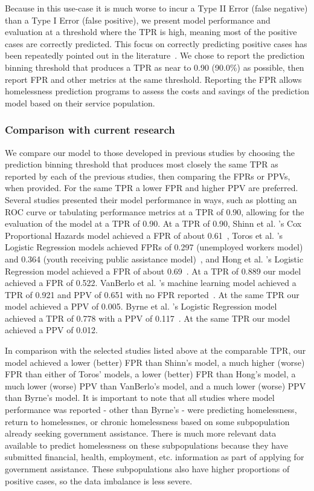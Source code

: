 \documentclass[10pt,letterpaper]{article}
\begin{document}
Because in this use-case it is much worse to incur a Type II Error (false negative) than a Type I Error (false positive), we present model performance and evaluation at a threshold where the TPR is high, meaning most of the positive cases are correctly predicted. This focus on correctly predicting positive cases has been repeatedly pointed out in the literature~\cite{vanberlo2021interpretable,hong2018applications}. We chose to report the prediction binning threshold that produces a TPR as near to 0.90 (90.0\%) as possible, then report FPR and other metrics at the same threshold. Reporting the FPR allows homelessness prediction programs to assess the costs and savings of the prediction model based on their service population.

\subsubsection*{Comparison with current research}
We compare our model to those developed in previous studies by choosing the prediction binning threshold that produces most closely the same TPR as reported by each of the previous studies, then comparing the FPRs or PPVs, when provided. For the same TPR a lower FPR and higher PPV are preferred. Several studies presented their model performance in ways, such as plotting an ROC curve or tabulating performance metrics at a TPR of 0.90, allowing for the evaluation of the model at a TPR of 0.90. At a TPR of 0.90, Shinn et al. 's Cox Proportional Hazards model achieved a FPR of about 0.61~\cite{shinn2013efficient}, Toros et al. 's Logistic Regression models achieved FPRs of 0.297 (unemployed workers model) and 0.364 (youth receiving public assistance model)~\cite{toros2019early}, and Hong et al. 's Logistic Regression model achieved a FPR of about 0.69~\cite{hong2018applications}. At a TPR of 0.889 our model achieved a FPR of 0.522. VanBerlo et al. 's machine learning model achieved a TPR of 0.921 and PPV of 0.651 with no FPR reported~\cite{vanberlo2021interpretable}. At the same TPR our model achieved a PPV of 0.005. Byrne et al. 's Logistic Regression model achieved a TPR of 0.778 with a PPV of 0.117~\cite{byrne2020classification}. At the same TPR our model achieved a PPV of 0.012.

In comparison with the selected studies listed above at the comparable TPR, our model achieved a lower (better) FPR than Shinn's model, a much higher (worse) FPR than either of Toros' models, a lower (better) FPR than Hong's model, a much lower (worse) PPV than VanBerlo's model, and a much lower (worse) PPV than Byrne's model. It is important to note that all studies where model performance was reported - other than Byrne's - were predicting homelessness, return to homelessnes, or chronic homelessness based on some subpopulation already seeking government assistance. There is much more relevant data available to predict homelessness on these subpopulations because they have submitted financial, health, employment, etc. information as part of applying for government assistance. These subpopulations also have higher proportions of positive cases, so the data imbalance is less severe.
\end{document}
